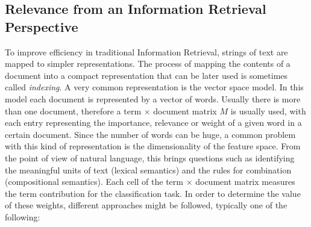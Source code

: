 \subsection{Relevance from an Information Retrieval Perspective}

To improve efficiency in traditional Information Retrieval, strings of text are mapped to simpler representations. The process of mapping the contents of a document into a compact representation that can be later used is sometimes called \textit{indexing}. A very common representation is the vector space model. In this model each document is represented by a vector of words. Usually there is more than one document, therefore a term $\times$ document matrix $M$ is usually used, with each entry representing the importance, relevance or weight of a given word in a certain document. Since the number of words can be huge, a common problem with this kind of representation is the dimensionality of the feature space. %
From the point of view of natural language, this brings questions such as identifying the meaningful units of text (lexical semantics) and the rules for combination (compositional semantics). 
Each cell of the term $\times$ document matrix measures the term contribution for the classification task. In order to determine the value of these weights, different approaches might be followed, typically one of the following\citep{Sebastiani2002MLTC, Yadav2015TextFiltration,Patra2013SurveyTCAlgorithms}:
